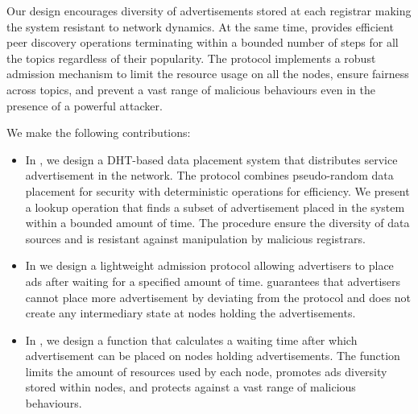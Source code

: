 Our design encourages diversity of advertisements stored at each registrar making the system resistant to network dynamics. At the same time, \sysname provides efficient peer discovery operations terminating within a bounded number of steps for all the topics regardless of their popularity. The protocol implements a robust admission mechanism to limit the resource usage on all the nodes, ensure fairness across topics, and prevent a vast range of malicious behaviours even in the presence of a powerful attacker.

 We make the following contributions:
\begin{itemize}
    \item In , we design a DHT-based data placement system that distributes service advertisement in the network. The protocol combines pseudo-random data placement for security with deterministic operations for efficiency. We present a lookup operation that finds a subset of advertisement placed in the system within a bounded amount of time. The procedure ensure the diversity of data sources and is resistant against manipulation by malicious registrars. 
    \item In  we design a lightweight admission protocol allowing advertisers to place ads after waiting for a specified amount of time. \sysname guarantees that advertisers cannot place more advertisement by deviating from the protocol and does not create any intermediary state at nodes holding the advertisements. 
    \item In , we design a function that calculates a waiting time after which advertisement can be placed on nodes holding advertisements. The function limits the amount of resources used by each node, promotes ads diversity stored within nodes, and protects against a vast range of malicious behaviours. 
\end{itemize}

